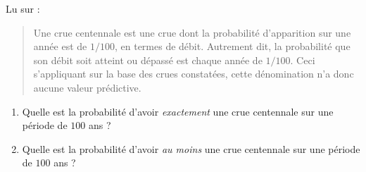 
\begin{exercice}\label{exosmath-0049}

    Lu sur  :
    \begin{quote}
    Une crue centennale est une crue dont la probabilité d'apparition sur une année est de $1/100$, en termes de débit. Autrement dit, la probabilité que son débit soit atteint ou dépassé est chaque année de $1/100$. Ceci s'appliquant sur la base des crues constatées, cette dénomination n'a donc aucune valeur prédictive.
    \end{quote}

    \begin{enumerate}
        \item
            Quelle est la probabilité d'avoir \emph{exactement} une crue centennale sur une période de \( 100\) ans ?
        \item
            Quelle est la probabilité d'avoir \emph{au moins} une crue centennale sur une période de \( 100\) ans ?
    \end{enumerate}

\end{exercice}
